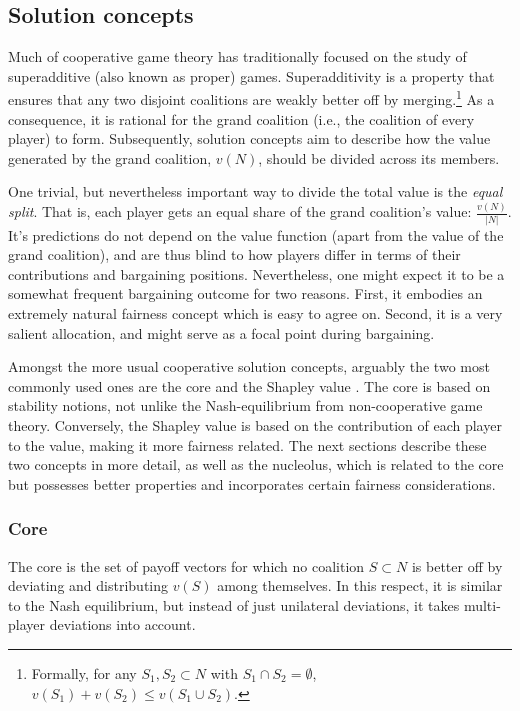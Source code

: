\documentclass[12pt]{article}
\begin{document}
\subsection{Solution concepts}

Much of cooperative game theory has traditionally focused on the study of superadditive (also known as proper) games. Superadditivity is a property that ensures that any two disjoint coalitions are weakly better off by merging.\footnote{Formally, for any $S_1, S_2 \subset N$ with $S_1 \cap S_2 = \emptyset$, $v(S_1) + v(S_2) \leq v(S_1 \cup S_2)$.} As a consequence, it is rational for the grand coalition (i.e., the coalition of every player) to form. Subsequently, solution concepts aim to describe how the value generated by the grand coalition, $v(N)$, should be divided across its members.

One trivial, but nevertheless important way to divide the total value is the \emph{equal split}. That is, each player gets an equal share of the grand coalition's value: $\frac{v(N)}{|N|}$. It's predictions do not depend on the value function (apart from the value of the grand coalition), and are thus blind to how players differ in terms of their contributions and bargaining positions. Nevertheless, one might expect it to be a somewhat frequent bargaining outcome for two reasons. First, it embodies an extremely natural fairness concept which is easy to agree on. Second, it is a very salient allocation, and might serve as a focal point during bargaining.

Amongst the more usual cooperative solution concepts, arguably the two most commonly used ones are the core \parencite{gillies1959solutions} and the Shapley value \parencite{shapley1953value}. The core is based on stability notions, not unlike the Nash-equilibrium from non-cooperative game theory. Conversely, the Shapley value is based on the contribution of each player to the value, making it more fairness related. The next sections describe these two concepts in more detail, as well as the nucleolus, which is related to the core but possesses better properties and incorporates certain fairness considerations.

\subsubsection{Core} \label{stability_statement}

The core is the set of payoff vectors for which no coalition $S \subset N$ is better off by deviating and distributing $v(S)$ among themselves. In this respect, it is similar to the Nash equilibrium, but instead of just unilateral deviations, it takes multi-player deviations into account.
\end{document}
